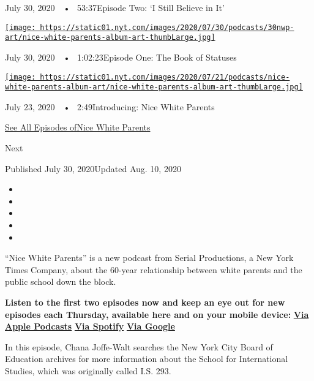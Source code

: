 July 30, 2020~~•~ 53:37Episode Two: `I Still Believe in It'

\href{https://www.nytimes.com/2020/07/30/podcasts/nice-white-parents-serial.html?action=click\&module=audio-series-bar\&region=header\&pgtype=Article}{\texttt{[image: https://static01.nyt.com/images/2020/07/30/podcasts/30nwp-art/nice-white-parents-album-art-thumbLarge.jpg]}}

July 30, 2020~~•~ 1:02:23Episode One: The Book of Statuses

\href{https://www.nytimes.com/2020/07/23/podcasts/nice-white-parents-serial.html?action=click\&module=audio-series-bar\&region=header\&pgtype=Article}{\texttt{[image: https://static01.nyt.com/images/2020/07/21/podcasts/nice-white-parents-album-art/nice-white-parents-album-art-thumbLarge.jpg]}}

July 23, 2020~~•~ 2:49Introducing: Nice White Parents

\href{https://www.nytimes.com/column/nice-white-parents}{See All
Episodes ofNice White Parents}

Next

Published July 30, 2020Updated Aug. 10, 2020

\begin{itemize}
\item
\item
\item
\item
\item
\end{itemize}

``Nice White Parents'' is a new podcast from Serial Productions, a New
York Times Company, about the 60-year relationship between white parents
and the public school down the block.

\textbf{Listen to the first two episodes now and keep an eye out for new
episodes each Thursday, available here and on your mobile device:}
\textbf{\href{https://podcasts.apple.com/us/podcast/nice-white-parents/id1524080195}{Via
Apple Podcasts}} \textbf{\textbar{}}
\textbf{\href{https://open.spotify.com/show/7oBSLCZFCgpdCaBjIG8mLV?si=YcEPLD3xT2ejXmpQz-tRpw}{Via
Spotify}} \textbf{\textbar{}}
\textbf{\href{https://podcasts.google.com/feed/aHR0cHM6Ly9yc3MuYXJ0MTkuY29tL25pY2Utd2hpdGUtcGFyZW50cw}{Via
Google}}

In this episode, Chana Joffe-Walt searches the New York City Board of
Education archives for more information about the School for
International Studies, which was originally called I.S. 293.

